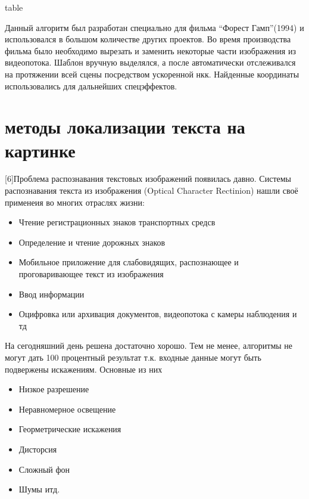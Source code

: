 \documentclass[oneside,final,14pt]{extreport}
\begin{document}
table

Данный алгоритм был разработан специально для фильма “Форест Гамп”(1994) и использовался в большом количестве других проектов. Во время производства фильма было необходимо вырезать и заменить некоторые части изображения из видеопотока. Шаблон вручную выделялся, а после автоматически отслеживался на протяжении всей сцены посредством ускоренной нкк. Найденные координаты использовались для дальнейших спецэффектов.

\chapter{методы локализации текста на картинке}
[6]Проблема распознавания текстовых изображений появилась давно. Системы распознавания текста из изображения (Optical Character Rectinion) нашли своё применеия во многих отраслях жизни:

\begin{itemize}[label= $-$, noitemsep]
\item Чтение регистрационных знаков транспортных средсв
\item Определение и чтение дорожных знаков

\item Мобильное приложение для слабовидящих, распознающее и проговаривающее текст из изображения

\item Ввод информации

\item Оцифровка или архивация документов, видеопотока с камеры наблюдения и тд

\end{itemize}

На сегодняшний день решена достаточно хорошо. Тем не менее, алгоритмы не могут дать 100 процентный результат т.к. входные данные могут быть подвержены искажениям. Основные из них

\begin{itemize}[label= $-$, noitemsep]
\item Низкое разрешение 


\item Неравномерное освещение

\item Георметрические искажения

\item Дисторсия

\item Сложный фон

\item Шумы итд.

\end{itemize}
\end{document}

